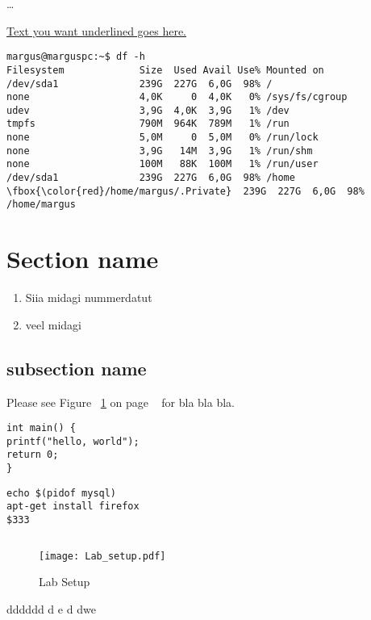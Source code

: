 \ldots
{}


\underline{Text you want underlined goes here.}




\begin{Verbatim}[frame=single,
label=Command output,framesep=2mm,rulecolor=\color{red},commandchars=\\\{\}]
margus@marguspc:~$ df -h
Filesystem             Size  Used Avail Use% Mounted on
/dev/sda1              239G  227G  6,0G  98% /
none                   4,0K     0  4,0K   0% /sys/fs/cgroup
udev                   3,9G  4,0K  3,9G   1% /dev
tmpfs                  790M  964K  789M   1% /run
none                   5,0M     0  5,0M   0% /run/lock
none                   3,9G   14M  3,9G   1% /run/shm
none                   100M   88K  100M   1% /run/user
/dev/sda1              239G  227G  6,0G  98% /home
\fbox{\color{red}/home/margus/.Private}  239G  227G  6,0G  98% /home/margus
\end{Verbatim}



\section{Section name}
\begin{enumerate}
	\item Siia midagi nummerdatut
	\item veel midagi
\end{enumerate}
\subsection{subsection name}
Please see Figure ~\ref{Lab Setup} on page ~\pageref{Lab Setup} for bla bla bla.

\begin{verbatim}
int main() {
printf("hello, world");
return 0;
}
\end{verbatim}
\begin{verbatim}
echo $(pidof mysql)
apt-get install firefox
$333
\end{verbatim}
\inputminted{sh}{code/simple.sh}

\begin{figure}
    \centering
	\texttt{[image: Lab\_setup.pdf]}
	\caption{Lab Setup}
	\label{Lab Setup}
\end{figure}


dddddd d  e d dwe \



